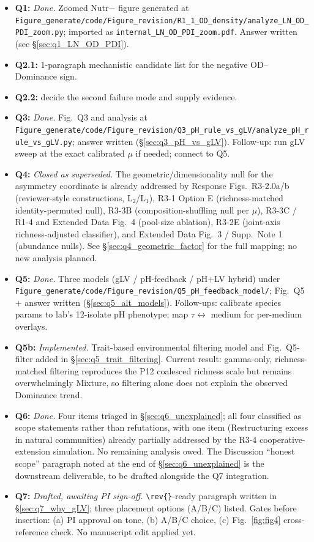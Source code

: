 \documentclass[11pt]{article}
\providecommand{\figref}[1]{Fig.~\ref{#1}}
\begin{document}
\begin{itemize}[itemsep=0pt]
    \item \textbf{Q1:} \emph{Done.} Zoomed Nutr$-$ figure generated at \texttt{Figure\_generate/code/Figure\_revision/R1\_1\_OD\_density/analyze\_LN\_OD\_PDI\_zoom.py}; imported as \texttt{internal\_LN\_OD\_PDI\_zoom.pdf}. Answer written (see \S\ref{sec:q1_LN_OD_PDI}).
    \item \textbf{Q2.1:} 1-paragraph mechanistic candidate list for the negative OD--Dominance sign.
    \item \textbf{Q2.2:} decide the second failure mode and supply evidence.
    \item \textbf{Q3:} \emph{Done.} Fig.~Q3 and analysis at \texttt{Figure\_generate/code/Figure\_revision/Q3\_pH\_rule\_vs\_gLV/analyze\_pH\_rule\_vs\_gLV.py}; answer written (\S\ref{sec:q3_pH_vs_gLV}). Follow-up: run gLV sweep at the exact calibrated $\mu$ if needed; connect to Q5.
    \item \textbf{Q4:} \emph{Closed as superseded.} The geometric/dimensionality null for the asymmetry coordinate is already addressed by Response Figs.~R3-2.0a/b (reviewer-style constructions, L$_2$/L$_1$), R3-1 Option E (richness-matched identity-permuted null), R3-3B (composition-shuffling null per $\mu$), R3-3C / R1-4 and Extended Data Fig.~4 (pool-size ablation), R3-2E (joint-axis richness-adjusted classifier), and Extended Data Fig.~3 / Supp.~Note 1 (abundance nulls). See \S\ref{sec:q4_geometric_factor} for the full mapping; no new analysis planned.
    \item \textbf{Q5:} \emph{Done.} Three models (gLV / pH-feedback / pH+LV hybrid) under \texttt{Figure\_generate/code/Figure\_revision/Q5\_pH\_feedback\_model/}; Fig.~Q5 + answer written (\S\ref{sec:q5_alt_models}). Follow-ups: calibrate species params to lab's 12-isolate pH phenotype; map $\tau \leftrightarrow$ medium for per-medium overlays.
    \item \textbf{Q5b:} \emph{Implemented.} Trait-based environmental filtering model and Fig.~Q5-filter added in \S\ref{sec:q5_trait_filtering}. Current result: gamma-only, richness-matched filtering reproduces the P12 coalesced richness scale but remains overwhelmingly Mixture, so filtering alone does not explain the observed Dominance trend.
    \item \textbf{Q6:} \emph{Done.} Four items triaged in \S\ref{sec:q6_unexplained}; all four classified as scope statements rather than refutations, with one item (Restructuring excess in natural communities) already partially addressed by the R3-4 cooperative-extension simulation. No remaining analysis owed. The Discussion ``honest scope'' paragraph noted at the end of \S\ref{sec:q6_unexplained} is the downstream deliverable, to be drafted alongside the Q7 integration.
    \item \textbf{Q7:} \emph{Drafted, awaiting PI sign-off.} \texttt{\textbackslash rev\{\}}-ready paragraph written in \S\ref{sec:q7_why_gLV}; three placement options (A/B/C) listed. Gates before insertion: (a) PI approval on tone, (b) A/B/C choice, (c) \figref{fig:fig4} cross-reference check. No manuscript edit applied yet.
\end{itemize}
\end{document}
